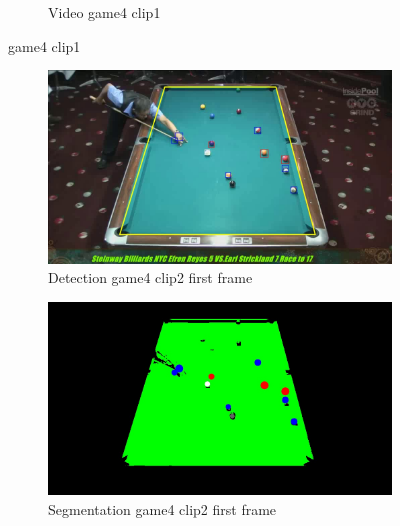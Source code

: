 \begin{figure}[H]
\begin{subfigure}[b]{0.48\textwidth}
    	\caption{Video game4 clip1}
    	\label{fig: game4_clip1_video}
    \end{subfigure}

	\caption{game4 clip1}
\end{figure}


\begin{figure}[H]
    \centering
    \begin{subfigure}[b]{0.48\textwidth}
        \centering
        \includegraphics[width=\textwidth]{images/Detection/game4_clip2_detected_balls_first_frame.jpg}
        \caption{Detection game4 clip2 first frame}
        \label{fig: game4_clip2_first_frame_detected}
    \end{subfigure}
    \begin{subfigure}[b]{0.48\textwidth}
        \centering
        \includegraphics[width=\textwidth]{images/Segmentation/game4_clip2_segmented_balls_first_frame.jpg}
        \caption{Segmentation game4 clip2 first frame}
		\label{fig: game4_clip2_first_frame_segmented}
    \end{subfigure}
    \begin{subfigure}[b]{0.48\textwidth}

\end{subfigure}
\end{figure}
